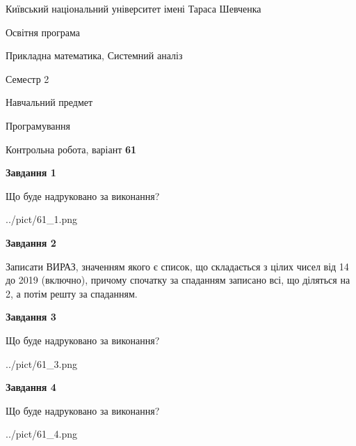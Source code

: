 \documentclass[12pt, ukrainian]{article}
\begin{document}
{{\begin {small}\par
{ \center  Київський національний університет імені Тараса Шевченка \par}
{\parbox {5 cm}{Освітня програма \hfill}{\parbox {8 cm}{Прикладна математика, Системний аналіз \hfill}}\parbox {5 cm}{\hfill Семестр 2}}\par
{\parbox {5 cm} {Навчальний предмет \hfill}\parbox {7 cm}{Програмування \hfill}\parbox {6cm}{\hfill}\par}\vspace{-7pt} \end{small}}{\center Контрольна робота, варіант  \No \textbf
{ 61 }\par}}
{
\begin {large}
{\begin {center}\textbf{Завдання 1}\end {center}}\par
Що буде надруковано за виконання?\par\par
\begin{center}
	{../pict/61_1.png}
\end{center}
\newpage

{\begin {center}\textbf{Завдання 2}\end {center}}\par

Записати ВИРАЗ, значенням якого є список, що складається з цілих чисел від 14 до 2019 (включно), причому спочатку за спаданням записано всі, що діляться на 2, а потім решту за спаданням.\par
\newpage

{\begin {center}\textbf{Завдання 3}\end {center}}\par
Що буде надруковано за виконання?\par
\begin{center}
	{../pict/61_3.png}
\end{center}
\newpage

{\begin {center}\textbf{Завдання 4}\end {center}}\par
Що буде надруковано за виконання?\par
\begin{center}
	{../pict/61_4.png}
\end{center}
\newpage


\end{large}}
\end{document}
